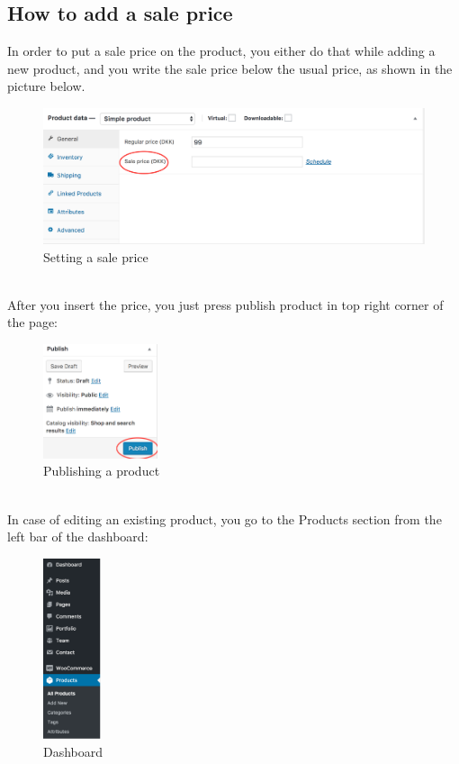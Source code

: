 \documentclass[12p]{article}
\begin{document}
\subsection{How to add a sale price}
In order to put a sale price on the product, you either do that while adding a new product, and you write the sale price below the usual price, as shown in the picture below.
\\
\begin{figure}[ht]
    \centering
    \includegraphics[width=1\textwidth]{5.png}
    \caption{Setting a sale price}
    \label{fig:wordpress_sale_price}
\end{figure}
\\
After you insert the price, you just press publish product in top right corner of the page:
\\
\begin{figure}[ht]
    \centering
    \includegraphics[width=0.3\textwidth]{6.png}
    \caption{Publishing a product}
    \label{fig:wordpress_publish_product}
\end{figure}
\\
In case of editing an existing product, you go to the Products section from the left bar of the dashboard:
\\
\begin{figure}[ht]
    \centering
    \includegraphics[width=0.15\textwidth]{7.png}
    \caption{Dashboard}
    \label{fig:wordpress_dashboard_products}
\end{figure}
\end{document}
